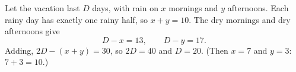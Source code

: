Let the vacation last $D$ days, with rain on $x$ mornings and $y$ afternoons. Each rainy day has exactly one rainy half, so $x+y=10$. The dry mornings and dry afternoons give
\[
D-x=13,\qquad D-y=17 .
\]
Adding, $2D-(x+y)=30$, so $2D=40$ and $D=\boxed{20}$. (Then $x=7$ and $y=3$: $7+3=10$.)
